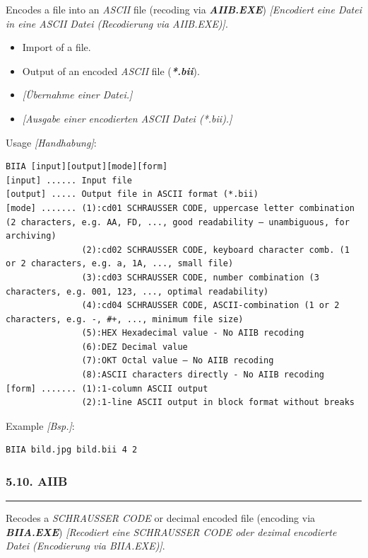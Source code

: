 \documentclass[
]{article}
\begin{document}
Encodes a file into an \emph{ASCII} file (recoding via
\textbf{\emph{AIIB.EXE}}) \emph{{[}Encodiert eine Datei in eine ASCII
Datei (Recodierung via AIIB.EXE){]}}.

\begin{itemize}
\item
  Import of a file.
\item
  Output of an encoded \emph{ASCII} file (\textbf{\emph{*.bii}}).
\item
  \emph{{[}Übernahme einer Datei.{]}}
\item
  \emph{{[}Ausgabe einer} \emph{encodierten ASCII Datei (*.bii).{]}}
\end{itemize}

Usage \emph{{[}Handhabung{]}}:

\begin{verbatim}
BIIA [input][output][mode][form]
[input] ...... Input file
[output] ..... Output file in ASCII format (*.bii)
[mode] ....... (1):cd01 SCHRAUSSER CODE, uppercase letter combination (2 characters, e.g. AA, FD, ..., good readability – unambiguous, for archiving)
               (2):cd02 SCHRAUSSER CODE, keyboard character comb. (1 or 2 characters, e.g. a, 1A, ..., small file) 
               (3):cd03 SCHRAUSSER CODE, number combination (3 characters, e.g. 001, 123, ..., optimal readability)
               (4):cd04 SCHRAUSSER CODE, ASCII-combination (1 or 2 characters, e.g. -, #+, ..., minimum file size) 
               (5):HEX Hexadecimal value - No AIIB recoding
               (6):DEZ Decimal value
               (7):OKT Octal value – No AIIB recoding
               (8):ASCII characters directly - No AIIB recoding
[form] ....... (1):1-column ASCII output 
               (2):1-line ASCII output in block format without breaks
\end{verbatim}

Example \emph{{[}Bsp.{]}}:

\begin{verbatim}
BIIA bild.jpg bild.bii 4 2
\end{verbatim}

\hypertarget{aiib}{%
\subsubsection{5.10. AIIB}\label{aiib}}

\begin{center}\rule{0.5\linewidth}{0.5pt}\end{center}

Recodes a \emph{SCHRAUSSER CODE} or decimal encoded file (encoding via
\textbf{\emph{BIIA.EXE}}) \emph{{[}Recodiert eine SCHRAUSSER CODE oder
dezimal encodierte Datei (Encodierung via BIIA.EXE){]}}.
\end{document}
